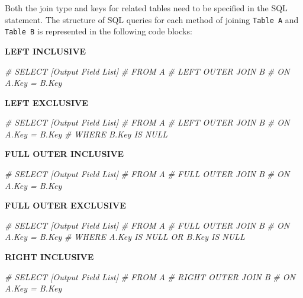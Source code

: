 \documentclass[
]{book}
\newenvironment{Shaded}{\begin{snugshade}}{\end{snugshade}}
\newcommand{\CommentTok}[1]{\textcolor[rgb]{0.56,0.35,0.01}{\textit{#1}}}
\begin{document}
Both the join type and keys for related tables need to be specified in the SQL statement. The structure of SQL queries for each method of joining \texttt{Table\ A} and \texttt{Table\ B} is represented in the following code blocks:

\textbf{LEFT INCLUSIVE}

\begin{Shaded}
\begin{Highlighting}[]
\CommentTok{\#  SELECT [Output Field List]}
\CommentTok{\#  FROM A }
\CommentTok{\#  LEFT OUTER JOIN B}
\CommentTok{\#  ON A.Key = B.Key}
\end{Highlighting}
\end{Shaded}

\textbf{LEFT EXCLUSIVE}

\begin{Shaded}
\begin{Highlighting}[]
\CommentTok{\#  SELECT [Output Field List]}
\CommentTok{\#  FROM A }
\CommentTok{\#  LEFT OUTER JOIN B}
\CommentTok{\#  ON A.Key = B.Key}
\CommentTok{\#  WHERE B.Key IS NULL}
\end{Highlighting}
\end{Shaded}

\textbf{FULL OUTER INCLUSIVE}

\begin{Shaded}
\begin{Highlighting}[]
\CommentTok{\#  SELECT [Output Field List]}
\CommentTok{\#  FROM A }
\CommentTok{\#  FULL OUTER JOIN B}
\CommentTok{\#  ON A.Key = B.Key}
\end{Highlighting}
\end{Shaded}

\textbf{FULL OUTER EXCLUSIVE}

\begin{Shaded}
\begin{Highlighting}[]
\CommentTok{\#  SELECT [Output Field List]}
\CommentTok{\#  FROM A }
\CommentTok{\#  FULL OUTER JOIN B}
\CommentTok{\#  ON A.Key = B.Key}
\CommentTok{\#  WHERE A.Key IS NULL OR B.Key IS NULL  }
\end{Highlighting}
\end{Shaded}

\textbf{RIGHT INCLUSIVE}

\begin{Shaded}
\begin{Highlighting}[]
\CommentTok{\#  SELECT [Output Field List]}
\CommentTok{\#  FROM A }
\CommentTok{\#  RIGHT OUTER JOIN B}
\CommentTok{\#  ON A.Key = B.Key}
\end{Highlighting}
\end{Shaded}
\end{document}
